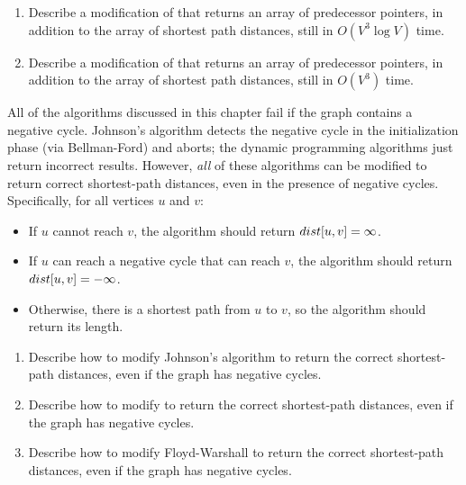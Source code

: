 \begin{exercises}
\item
\begin{enumerate}
\item Describe a modification of  that returns an array of predecessor pointers, in addition to the array of shortest path distances, still in $O(V^3 \log V)$ time.
\item Describe a modification of  that returns an array of predecessor pointers, in addition to the array of shortest path distances, still in $O(V^3)$ time.
\end{enumerate}

\item All of the algorithms discussed in this chapter fail if the graph contains a negative cycle.
Johnson’s algorithm detects the negative cycle in the initialization phase (via Bellman-Ford) and aborts; the dynamic programming algorithms just return incorrect results.
However, \textit{all} of these algorithms can be modified to return correct shortest-path distances, even in the presence of negative cycles.
Specifically, for all vertices $u$ and $v$:
\begin{itemize}
\item If $u$ cannot reach $v$, the algorithm should return $dist[u, v] = \infty$.
\item If $u$ can reach a negative cycle that can reach $v$, the algorithm should return $dist[u, v] = -\infty$.
\item Otherwise, there is a shortest path from $u$ to $v$, so the algorithm should return its length.
\end{itemize}
\begin{enumerate}
\item Describe how to modify Johnson’s algorithm to return the correct shortest-path distances, even if the graph has negative cycles.
\item Describe how to modify  to return the correct shortest-path distances, even if the graph has negative cycles.
\item Describe how to modify Floyd-Warshall to return the correct shortest-path distances, even if the graph has negative cycles.
\end{enumerate}


\end{exercises}
